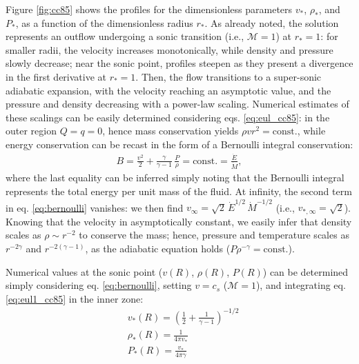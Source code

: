 Figure \ref{fig:cc85} shows the profiles for the dimensionless parameters $v_*$, $\rho_*$, and $P_*$, as a function of the dimensionless radius $r_*$. As already noted, the solution represents an outflow undergoing a sonic transition (i.e., $\mathcal{M} = 1$) at $r_* = 1$: for smaller radii, the velocity increases monotonically, while density and pressure slowly decrease; near the sonic point, profiles steepen as they present a divergence in the first derivative at $r_*=1$. Then, the flow transitions to a super-sonic adiabatic expansion, with the velocity reaching an asymptotic value, and the pressure and density decreasing with a power-law scaling. Numerical estimates of these scalings can be easily determined considering eqs. \ref{eq:eul_cc85}: in the outer region $Q=q=0$, hence mass conservation yields $\rho v r^2 = \mathrm{const.}$, while energy conservation can be recast in the form of a Bernoulli integral conservation: 
\begin{align}
 B = \frac{v^2}{2} + \frac{\gamma}{\gamma -1}\,\frac{P}{\rho} = \mathrm{const.} = \frac{\dot{E}}{\dot{M}}, \label{eq:bernoulli}
\end{align}
where the last equality can be inferred simply noting that the Bernoulli integral represents the total energy per unit mass of the fluid. At infinity, the second term in eq. \ref{eq:bernoulli} vanishes: we then find $v_\infty = \sqrt{2}\,\dot{E}^{1/2}\,\dot{M}^{-1/2}$ (i.e., $v_{*,\infty} = \sqrt{2}$). Knowing that the velocity in asymptotically constant, we easily infer that density scales as $\rho\sim r^{-2}$ to conserve the mass; hence, pressure and temperature scales as $r^{-2\gamma}$ and $r^{-2(\gamma-1)}$, as the adiabatic equation holds ($P\rho^{-\gamma}=\mathrm{const.}$). 

Numerical values at the sonic point ($v(R)$, $\rho(R)$, $P(R)$) can be determined simply considering eq. \ref{eq:bernoulli}, setting $v=c_s$ ($\mathcal{M}=1$), and integrating eq. \ref{eq:eul1_cc85} in the inner zone:
\begin{subequations}
\begin{align}
    &v_*(R) = \left(\frac{1}{2}+\frac{1}{\gamma-1}\right)^{-1/2}\label{eq:bound_cc85_1}\\
    &\rho_*(R) = \frac{1}{4\pi v_*}\\
    &P_*(R) = \frac{v_*}{4\pi \gamma}\label{eq:bound_cc85_3}
\end{align}
\end{subequations}

